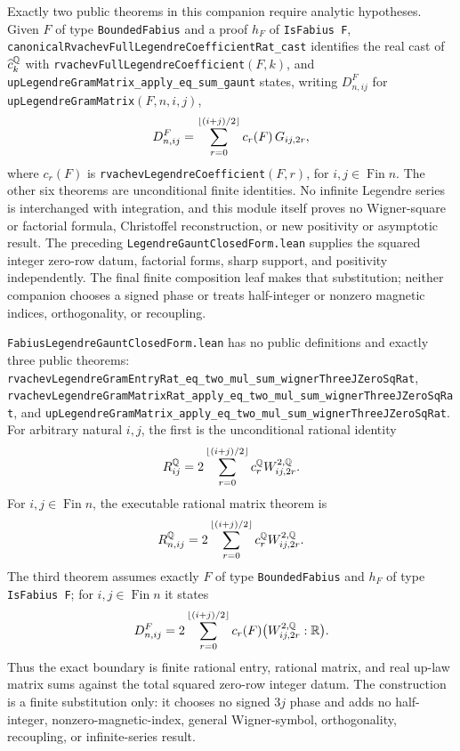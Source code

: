 \documentclass[11pt,oneside]{article}
\theoremstyle{definition}
\theoremstyle{remark}
\newcommand{\FullRvachevLegendreCoefficientRat}[1]{\widehat c_{#1}^{\RationalNumbers}}
\begin{document}
Exactly two public theorems in this companion require analytic hypotheses.
Given \(F\) of type \nolinkurl{BoundedFabius} and a proof \(h_F\) of
\nolinkurl{IsFabius F},
\nolinkurl{canonicalRvachevFullLegendreCoefficientRat_cast} identifies the real cast
of \(\FullRvachevLegendreCoefficientRat{k}\) with
\nolinkurl{rvachevFullLegendreCoefficient}\((F,k)\), and
\nolinkurl{upLegendreGramMatrix_apply_eq_sum_gaunt} states, writing
\(D^F_{n,ij}\) for \nolinkurl{upLegendreGramMatrix}\((F,n,i,j)\),
\[
 D^F_{n,ij}
 =\sum_{r=0}^{\left\lfloor (i+j)/2\right\rfloor}c_r(F)\,G_{ij,2r},
\]
where \(c_r(F)\) is \nolinkurl{rvachevLegendreCoefficient}\((F,r)\), for
\(i,j\in\operatorname{Fin} n\).  The other six theorems are unconditional finite
identities.  No infinite Legendre series is interchanged with integration, and this
module itself proves no Wigner-square or factorial formula, Christoffel
reconstruction, or new positivity or asymptotic result.  The preceding
\nolinkurl{LegendreGauntClosedForm.lean} supplies the squared integer zero-row datum,
factorial forms, sharp support, and positivity independently.  The final finite
composition leaf makes that substitution; neither companion chooses a signed phase or
treats half-integer or nonzero magnetic indices, orthogonality, or recoupling.

\nolinkurl{FabiusLegendreGauntClosedForm.lean} has no public definitions and exactly
three public theorems:
\nolinkurl{rvachevLegendreGramEntryRat_eq_two_mul_sum_wignerThreeJZeroSqRat},
\nolinkurl{rvachevLegendreGramMatrixRat_apply_eq_two_mul_sum_wignerThreeJZeroSqRat}, and
\nolinkurl{upLegendreGramMatrix_apply_eq_two_mul_sum_wignerThreeJZeroSqRat}.
For arbitrary natural \(i,j\), the first is the unconditional rational identity
\[
 R_{ij}^{\mathbb{Q}}
 =2\sum_{r=0}^{\left\lfloor (i+j)/2\right\rfloor}
 c_r^{\mathbb{Q}}W_{ij,2r}^{2,\mathbb{Q}}.
\]
For \(i,j\in\operatorname{Fin} n\), the executable rational matrix theorem is
\[
 R_{n,ij}^{\mathbb{Q}}
 =2\sum_{r=0}^{\left\lfloor (i+j)/2\right\rfloor}
 c_r^{\mathbb{Q}}W_{ij,2r}^{2,\mathbb{Q}}.
\]
The third theorem assumes exactly \(F\) of type \nolinkurl{BoundedFabius} and
\(h_F\) of type \nolinkurl{IsFabius F}; for \(i,j\in\operatorname{Fin} n\) it states
\[
 D^F_{n,ij}
 =2\sum_{r=0}^{\left\lfloor (i+j)/2\right\rfloor}
 c_r(F)\bigl(W_{ij,2r}^{2,\mathbb{Q}}:\mathbb{R}\bigr).
\]
Thus the exact boundary is finite rational entry, rational matrix, and real up-law
matrix sums against the total squared zero-row integer datum.  The construction is a
finite substitution only: it chooses no signed \(3j\) phase and adds no half-integer,
nonzero-magnetic-index, general Wigner-symbol, orthogonality, recoupling, or
infinite-series result.
\end{document}
